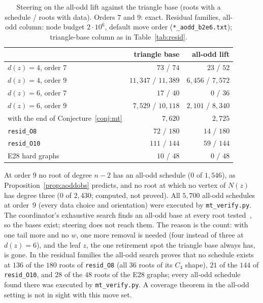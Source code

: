 \documentclass[11pt]{amsart}
\theoremstyle{definition}
\begin{document}
\begin{table}[ht]
\caption{Steering on the all-odd lift against the triangle base (roots with a schedule / roots with
data). Orders $7$ and $9$: exact. Residual families, all-odd column: node budget $2\cdot10^6$, default move order
(\texttt{*\_aodd\_b2e6.txt}); triangle-base column as in Table~\ref{tab:resid}.}\label{tab:aodd}
\small
\begin{tabular}{@{}lrr@{}}
\toprule
 & triangle base & all-odd lift\\
\midrule
$d(z)=4$, order $7$ & $73$ / $74$ & $23$ / $52$\\
$d(z)=4$, order $9$ & $11{,}347$ / $11{,}389$ & $6{,}456$ / $7{,}572$\\
$d(z)=6$, order $7$ & $17$ / $40$ & $0$ / $36$\\
$d(z)=6$, order $9$ & $7{,}529$ / $10{,}118$ & $2{,}101$ / $8{,}340$\\
\quad with the end of Conjecture~\ref{conj:mt} & $7{,}620$ & $2{,}725$\\
\texttt{resid\_O8} & $72$ / $180$ & $14$ / $180$\\
\texttt{resid\_O10} & $111$ / $144$ & $59$ / $144$\\
E28 hard graphs & $10$ / $48$ & $0$ / $48$\\
\bottomrule
\end{tabular}
\end{table}

At order $9$ no root of degree $n-2$ has an all-odd schedule ($0$ of $1{,}546$), as
Proposition~\ref{prop:aoddobs} predicts, and no root at which no vertex of $N(z)$ has degree three ($0$
of $2{,}430$; computed, not proved). All $5{,}700$ all-odd schedules at order~$9$ (every data choice and
orientation) were executed by \texttt{mt\_verify.py}. The coordinator's exhaustive search finds an
all-odd base at every root tested~\cite[\S31]{SYN}, so the bases exist; steering does not reach
them. The reason is the count: with one tail more and no $w$, one more removal is needed (four
instead of three at $d(z)=6$), and the leaf $z$, the one retirement spot the triangle base always
has, is gone. In the residual families the all-odd search proves that no schedule exists at $136$
of the $180$ roots of \texttt{resid\_O8} (all $36$ roots of its $C_4$ shape), $21$ of the $144$ of
\texttt{resid\_O10}, and $28$ of the $48$ roots of the E28 graphs; every all-odd schedule found there was executed by
\texttt{mt\_verify.py}. A coverage theorem in the all-odd setting is not in sight with this move
set.
\end{document}
